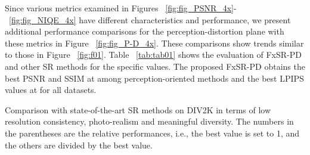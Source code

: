 \documentclass{article}
\begin{document}
Since various metrics examined in Figures ~\ref{fig:fig_PSNR_4x}-~\ref{fig:fig_NIQE_4x} have different characteristics and performance, we present additional performance comparisons for the perception-distortion plane with these metrics in Figure ~\ref{fig:fig_P-D_4x}. These comparisons show trends similar to those in Figure ~\ref{fig:f01}.
Table ~\ref{tab:tab01} shows the evaluation of FxSR-PD and other SR methods for the specific  values. The proposed FxSR-PD obtains the best PSNR and SSIM at  among perception-oriented methods and the best LPIPS values at  for all datasets.

\begin{table}[!ht]
\caption{Comparison with state-of-the-art SR methods on DIV2K in terms of low resolution consistency, photo-realism and meaningful diversity. The numbers in the parentheses are the relative performances, i.e., the best value is set to 1, and the others are divided by the best value.}



\end{table}
\end{document}
